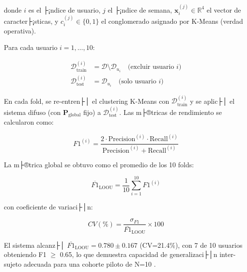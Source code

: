 donde \(i\) es el ├¡ndice de usuario, \(j\) el ├¡ndice de semana, \(\mathbf{x}_i^{(j)} \in \mathbb{R}^4\) el vector de caracter├¡sticas, y \(c_i^{(j)} \in \{0, 1\}\) el conglomerado asignado por K-Means (verdad operativa).

Para cada usuario \(i = 1, \ldots, 10\):

\begin{align}
\mathcal{D}_{\text{train}}^{(i)} &= \mathcal{D} \setminus \mathcal{D}_{u_i} \quad \text{(excluir usuario } i\text{)} \label{eq:loou_train} \\
\mathcal{D}_{\text{test}}^{(i)} &= \mathcal{D}_{u_i} \quad \text{(solo usuario } i\text{)} \label{eq:loou_test}
\end{align}

En cada fold, se re-entren├│ el clustering K-Means con \(\mathcal{D}_{\text{train}}^{(i)}\) y se aplic├│ el sistema difuso (con \(\mathbf{P}_{\text{global}}\) fijo) a \(\mathcal{D}_{\text{test}}^{(i)}\). Las m├®tricas de rendimiento se calcularon como:

\begin{equation}
F1^{(i)} = \frac{2 \cdot \text{Precision}^{(i)} \cdot \text{Recall}^{(i)}}{\text{Precision}^{(i)} + \text{Recall}^{(i)}}
\label{eq:f1_fold}
\end{equation}

La m├®trica global se obtuvo como el promedio de los 10 folds:

\begin{equation}
\overline{F1}_{\text{LOOU}} = \frac{1}{10} \sum_{i=1}^{10} F1^{(i)}
\label{eq:f1_loou_global}
\end{equation}

con coeficiente de variaci├│n:

\begin{equation}
CV(\%) = \frac{\sigma_{F1}}{\overline{F1}_{\text{LOOU}}} \times 100
\label{eq:cv_loou}
\end{equation}

El sistema alcanz├│ \(\overline{F1}_{\text{LOOU}} = 0.780 \pm 0.167\) (CV=21.4\%), con 7 de 10 usuarios obteniendo F1 \(\geq\) 0.65, lo que demuestra capacidad de generalizaci├│n inter-sujeto adecuada para una cohorte piloto de N=10 \citep{Alinia2020}.



